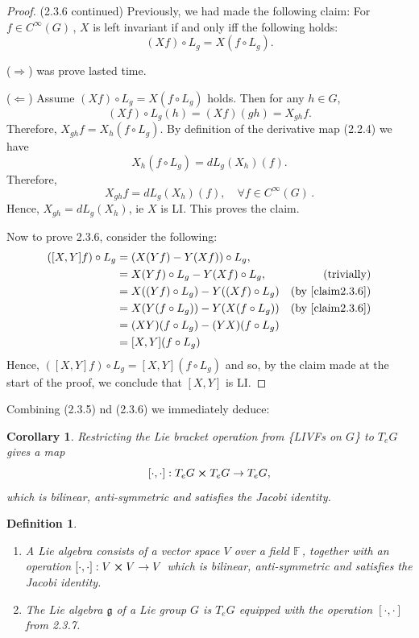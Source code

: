 \documentclass[12pt,a4paper]{article}
\newcommand{\fF}{\ensuremath{\mathbb{F}\,}}
\newcommand{\cinfn}[1]{\ensuremath{C^{\infty}(#1)\,}}
\newtheorem{defn}[thm]{Definition}
\newtheorem{cor}[thm]{Corollary}
\begin{document}
\begin{proof} (2.3.6 continued)
Previously, we had made the following claim: For $f\in \cinfn{G}$, $X$ is left invariant if and only iff the following holds:
\[ (Xf)\circ L_g = X(f\circ L_g). \label{claim2.3.6} \tag{$\circledast$} \]

($\Longrightarrow$) was prove lasted time.

($\Longleftarrow$) Assume $(Xf)\circ L_g = X(f\circ L_g)$ holds. Then for any $h\in G$,
\[ (Xf)\circ L_g(h) = (Xf)(gh) = X_{gh}f. \]
Therefore, $X_{gh}f = X_h(f\circ L_g)$. By definition of the derivative map (2.2.4) we have
\[ X_h(f\circ L_g) = dL_g(X_h)(f). \]
Therefore,
\[ X_{gh}f = dL_g(X_h)(f), \quad \forall f \in \cinfn{G}. \]
Hence, $X_{gh} = dL_g(X_h)$, ie $X$ is LI. This proves the claim.

Now to prove 2.3.6, consider the following:
\begin{align*}
([X, Y]f)\circ L_g &= (X(Yf) - Y(Xf))\circ L_g, & \\
&= X(Yf)\circ L_g - Y(Xf)\circ L_g, & \mbox{(trivially)} \\
&= X((Yf)\circ L_g) - Y((Xf)\circ L_g) & \mbox{(by \ref{claim2.3.6})} \\
&= X(Y(f\circ L_g)) - Y(X(f\circ L_g)) & \mbox{(by \ref{claim2.3.6})} \\
&= (XY)(f\circ L_g) - (YX)(f\circ L_g) \\
&= [X, Y](f\circ L_g)
\end{align*}
Hence, $([X, Y]f)\circ L_g = [X, Y](f\circ L_g)$ and so, by the claim made at the start of the proof, we conclude that $[X, Y]$ is LI.
\end{proof}

Combining (2.3.5) nd (2.3.6) we immediately deduce:

\begin{cor}
Restricting the Lie bracket operation from \{LIVFs on $G$\} to $T_eG$ gives a map
\[ [\cdot , \cdot]: T_eG \cross T_eG \to T_eG, \]
which is bilinear, anti-symmetric and satisfies the Jacobi identity.
\end{cor}

\begin{defn}
\begin{enumerate}
\item A Lie algebra consists of a vector space $V$ over a field \fF, together with an operation $[\cdot , \cdot]:V\cross V \to V$ which is bilinear, anti-symmetric and satisfies the Jacobi identity.

\item The Lie algebra $\mathfrak{g}$ of a Lie group $G$ is $T_eG$ equipped with the operation $[\cdot , \cdot]$ from 2.3.7.
\end{enumerate}
\end{defn}
\end{document}
